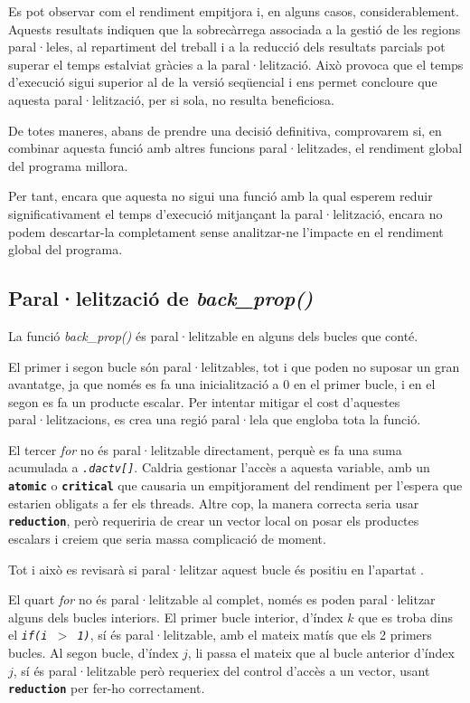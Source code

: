 \documentclass{article}
\begin{document}
Es pot observar com el rendiment empitjora i, en alguns casos, considerablement. Aquests resultats indiquen que la sobrecàrrega associada a la gestió de les regions paral·leles, al repartiment del treball i a la reducció dels resultats parcials pot superar el temps estalviat gràcies a la paral·lelització. Això provoca que el temps d'execució sigui superior al de la versió seqüencial i ens permet concloure que aquesta paral·lelització, per si sola, no resulta beneficiosa.

De totes maneres, abans de prendre una decisió definitiva, comprovarem si, en combinar aquesta funció amb altres funcions paral·lelitzades, el rendiment global del programa millora.

Per tant, encara que aquesta no sigui una funció amb la qual esperem reduir significativament el temps d'execució mitjançant la paral·lelització, encara no podem descartar-la completament sense analitzar-ne l'impacte en el rendiment global del programa.

\subsection{Paral·lelització de \textit{back\_prop()}}

La funció \textit{back\_prop()} és paral·lelitzable en alguns dels bucles que conté. 

El primer i segon bucle són paral·lelitzables, tot i que poden no suposar un gran avantatge, ja que només es fa una inicialització a 0 en el primer bucle, i en el segon es fa un producte escalar. Per intentar mitigar el cost d'aquestes paral·lelitzacions, es crea una regió paral·lela que engloba tota la funció.

El tercer \textit{for} no és paral·lelitzable directament, perquè es fa una suma acumulada a \textit{\texttt{.dactv[]}}. Caldria gestionar l'accès a aquesta variable, amb un \textbf{\texttt{atomic}} o \textbf{\texttt{critical}} que causaria un empitjorament del rendiment per l'espera que estarien obligats a fer els threads. Altre cop, la manera correcta seria usar \textbf{\texttt{reduction}}, però requeriria de crear un vector local on posar els productes escalars i creiem que seria massa complicació de moment.

Tot i això es revisarà si paral·lelitzar aquest bucle és positiu en l'apartat \texttt{}.

El quart \textit{for} no és paral·lelitzable al complet, només es poden paral·lelitzar alguns dels bucles interiors. El primer bucle interior, d'índex $k$ que es troba dins el \textit{\texttt{if(i $>$ 1)}}, sí és paral·lelitzable, amb el mateix matís que els 2 primers bucles. 
Al segon bucle, d'índex $j$, li passa el mateix que al bucle anterior d'índex $j$, sí és paral·lelitzable però requeriex del control d'accès a un vector, usant \textbf{\texttt{reduction}} per fer-ho correctament.
\end{document}
